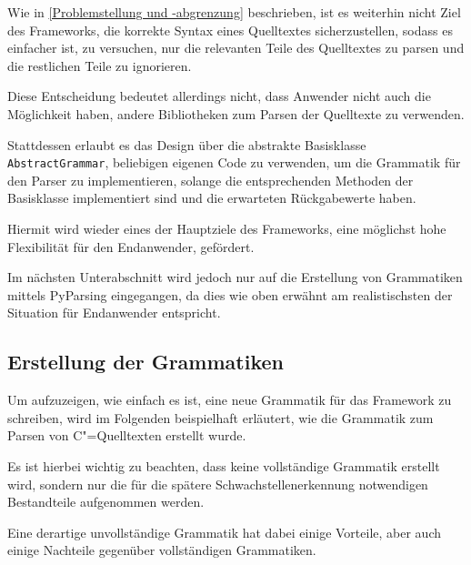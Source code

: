                 Wie in
                \vref{Problemstellung und
                -abgrenzung} beschrieben,
                ist es weiterhin nicht Ziel des Frameworks,
                die korrekte Syntax eines Quelltextes sicherzustellen,
                sodass es einfacher ist,
                zu versuchen,
                nur die relevanten Teile des Quelltextes zu parsen und
                die restlichen Teile zu ignorieren.

                Diese Entscheidung bedeutet allerdings nicht,
                dass Anwender nicht auch die Möglichkeit haben,
                andere Bibliotheken zum Parsen der Quelltexte zu verwenden.

                Stattdessen erlaubt es das Design über die abstrakte Basisklasse
                \lstinline{AbstractGrammar},
                beliebigen eigenen Code zu verwenden,
                um die Grammatik für den Parser zu implementieren,
                solange die entsprechenden Methoden der Basisklasse implementiert sind und
                die erwarteten Rückgabewerte haben.

                Hiermit wird wieder eines der Hauptziele des Frameworks,
                eine möglichst hohe Flexibilität für den Endanwender,
                gefördert.

                Im nächsten Unterabschnitt wird jedoch nur auf die Erstellung von Grammatiken mittels PyParsing eingegangen,
                da dies
                wie oben erwähnt am realistischsten der Situation für Endanwender entspricht.

        \subsection{Erstellung der Grammatiken}
            Um aufzuzeigen,
            wie einfach es ist,
            eine neue Grammatik für das Framework zu schreiben,
            wird im Folgenden beispielhaft erläutert,
            wie die Grammatik zum Parsen von C"=Quelltexten erstellt wurde.

            Es ist hierbei wichtig zu beachten,
            dass keine vollständige Grammatik erstellt wird,
            sondern nur die für die spätere Schwachstellenerkennung notwendigen Bestandteile aufgenommen werden.

            Eine derartige unvollständige Grammatik hat dabei einige Vorteile,
            aber auch einige Nachteile gegenüber vollständigen Grammatiken.

